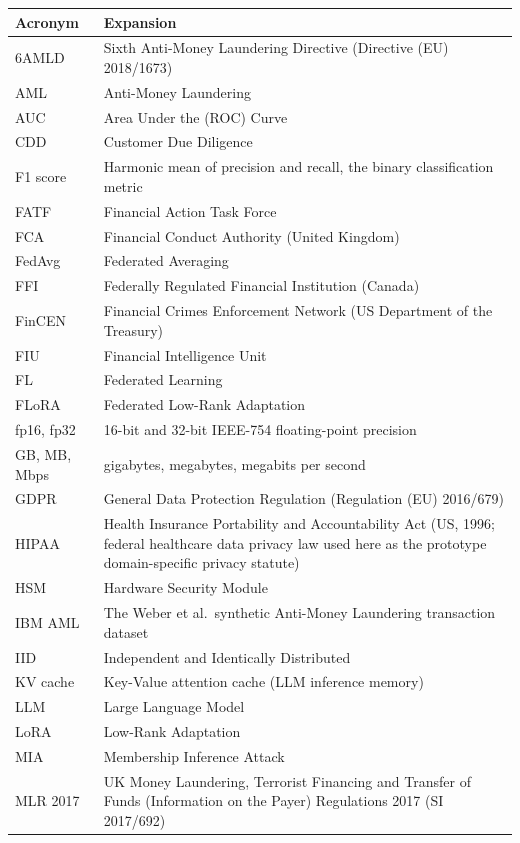\documentclass{report}
\begin{document}
\begin{tabularx}{\textwidth}{l X}
\toprule
\textbf{Acronym} & \textbf{Expansion} \\
\midrule
6AMLD & Sixth Anti-Money Laundering Directive (Directive (EU) 2018/1673) \\
AML & Anti-Money Laundering \\
AUC & Area Under the (ROC) Curve \\
CDD & Customer Due Diligence \\
F1 score & Harmonic mean of precision and recall, the binary classification metric \\
FATF & Financial Action Task Force \\
FCA & Financial Conduct Authority (United Kingdom) \\
FedAvg & Federated Averaging \\
FFI & Federally Regulated Financial Institution (Canada) \\
FinCEN & Financial Crimes Enforcement Network (US Department of the Treasury) \\
FIU & Financial Intelligence Unit \\
FL & Federated Learning \\
FLoRA & Federated Low-Rank Adaptation \\
fp16, fp32 & 16-bit and 32-bit IEEE-754 floating-point precision \\
GB, MB, Mbps & gigabytes, megabytes, megabits per second \\
GDPR & General Data Protection Regulation (Regulation (EU) 2016/679) \\
HIPAA & Health Insurance Portability and Accountability Act (US, 1996; federal healthcare data privacy law used here as the prototype domain-specific privacy statute) \\
HSM & Hardware Security Module \\
IBM AML & The Weber et al.~synthetic Anti-Money Laundering transaction dataset \\
IID & Independent and Identically Distributed \\
KV cache & Key-Value attention cache (LLM inference memory) \\
LLM & Large Language Model \\
LoRA & Low-Rank Adaptation \\
MIA & Membership Inference Attack \\
MLR 2017 & UK Money Laundering, Terrorist Financing and Transfer of Funds (Information on the Payer) Regulations 2017 (SI 2017/692) \\

\end{tabularx}
\end{document}
